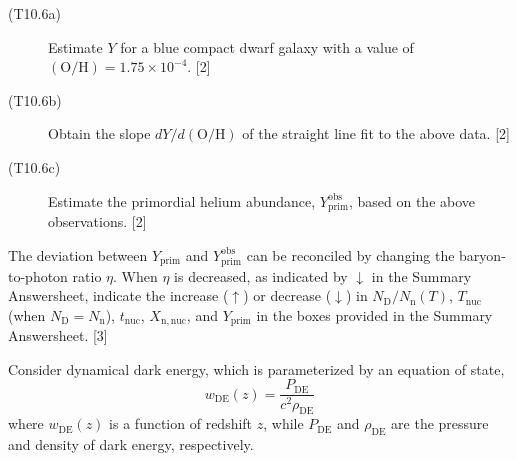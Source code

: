 \begin{description}

  \begin{description}
  \item[(T10.6a)] Estimate $Y$ for a blue compact dwarf galaxy with a value of
    $\mathrm{(O/H)} = 1.75 \times 10^{-4}$. \hfill[2]
  \item[(T10.6b)] Obtain the slope $dY/d\mathrm{(O/H)}$ of the straight line
    fit to the above data. \hfill[2]
  \item[(T10.6c)] Estimate the primordial helium abundance,
    $Y^{\mathrm{obs}}_{\mathrm{prim}}$, based on the above observations.
    \hfill[2]
  \end{description}
\item[(T10.7)] The deviation between $Y_{\mathrm{prim}}$ and
  $Y^{\mathrm{obs}}_{\mathrm{prim}}$ can be reconciled by changing the
  baryon-to-photon ratio $\eta$. When $\eta$ is decreased, as indicated by
  $\downarrow$ in the Summary Answersheet, indicate the increase ($\uparrow$)
  or decrease ($\downarrow$) in $N_{\mathrm{D}}/N_{\mathrm{n}}(T)$,
  $T_{\mathrm{nuc}}$ (when $N_{\mathrm{D}} = N_{\mathrm{n}}$),
  $t_{\mathrm{nuc}}$, $X_{\mathrm{n,nuc}}$, and $Y_{\mathrm{prim}}$ in the
  boxes provided in the Summary Answersheet. \hfill[3]
\end{description}

Consider dynamical dark energy, which is parameterized by an equation of
state,
\[ w_{\mathrm{DE}}(z) = \frac{P_{\mathrm{DE}}}{c^2 \rho_{\mathrm{DE}}} \]
where $w_{\mathrm{DE}}(z)$ is a function of redshift $z$, while
$P_{\mathrm{DE}}$ and $\rho_{\mathrm{DE}}$ are the pressure and density of
dark energy, respectively.

